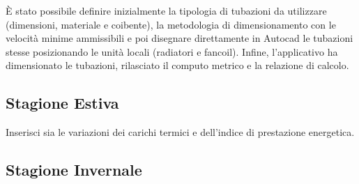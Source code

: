 È stato possibile definire inizialmente la tipologia di tubazioni da utilizzare (dimensioni, materiale e coibente), la metodologia di dimensionamento con le velocità minime ammissibili e poi disegnare direttamente in Autocad le tubazioni stesse posizionando le unità locali (radiatori e fancoil). Infine, l'applicativo ha dimensionato le tubazioni, rilasciato il computo metrico e la relazione di calcolo.
\clearpage
\subsection{Stagione Estiva}
Inserisci sia le variazioni dei carichi termici e dell'indice di prestazione energetica.
\subsection{Stagione Invernale}
